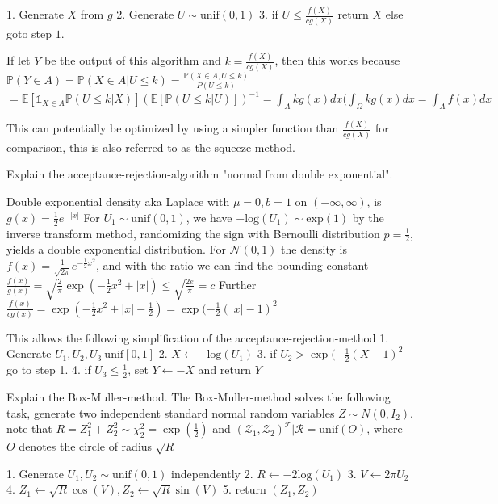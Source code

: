 1. Generate \( X \) from \( g \)
2. Generate \( U \sim \text{unif}(0, 1) \)
3. if \( U \leq \frac{f(X)}{cg(X)} \) return \( X \) else goto step \( 1 \).

If let \( Y \) be the output of this algorithm and \( k = \frac{f(X)}{cg(X)} \), then this works because
\( \mathbb{P}(Y \in A) = \mathbb{P}(X \in A|U \leq k) = \frac{\mathbb{P}(X \in A, U \leq k)}{P(U \leq k)} \)
\( = \mathbb{E}[\mathbb{1}_{X \in A}\mathbb{P}(U \leq k|X)](\mathbb{E}[\mathbb{P}(U \leq k|U)])^{-1} = \int_A k g(x) dx (\int_\Omega k g(x) dx = \int_A f(x) dx \)

This can potentially be optimized by using a simpler function than \(\frac{f(X)}{cg(X)} \) for comparison, this is also referred to as the squeeze method.


Explain the acceptance-rejection-algorithm "normal from double exponential".

Double exponential density aka Laplace with \( \mu = 0, b = 1 \) on \( (-\infty, \infty) \), is \( g(x) = \frac{1}{2} e^{-|x|} \)
For \( U_1 \sim \text{unif}(0, 1) \), we have \( -\text{log}(U_1) \sim \text{exp}(1) \) by the inverse transform method,
randomizing the sign with Bernoulli distribution \( p = \frac{1}{2} \), yields a double exponential distribution.
For \( \mathcal{N}(0, 1) \) the density is \( f(x) = \frac{1}{\sqrt{2\pi}}e^{-\frac{1}{2}x^2} \), and with the ratio 
we can find the bounding constant
\( \frac{f(x)}{g(x)} = \sqrt{\frac{2}{\pi}}\exp(-\frac{1}{2}x^2 + |x|) \leq \sqrt{\frac{2e}{\pi}} = c \)
Further \( \frac{f(x)}{cg(x)} = \exp(-\frac{1}{2}x^2 + |x| - \frac{1}{2}) = \exp(-\frac{1}{2}(|x| - 1)^{2} \)

This allows the following simplification of the acceptance-rejection-method
1. Generate \( U_1, U_2, U_3 ~ \text{unif}[0, 1] \)
2. \( X \leftarrow - \text{log}(U_1) \)
3. if \( U_2 > \exp(-\frac{1}{2}(X - 1)^2 \) go to step 1.
4. if \( U_3 \leq \frac{1}{2} \), set \( Y \leftarrow -X \) and return \( Y \)



Explain the Box-Muller-method.
The Box-Muller-method solves the following task, 
generate two independent standard normal random variables \( Z \sim N(0, I_2)\).
note that \( R = Z^2_1 + Z^2_2 \sim \chi_2^{2} = \exp(\frac{1}{2}) \)
and \( \mathcal{(Z_1, Z_2)^{T}|R} = \text{unif}(O) \), where \( O \) denotes the circle of radius \( \sqrt{R} \)

1. Generate \( U_1, U_2 \sim \text{unif}(0, 1) \) independently
2. \( R \leftarrow -2\text{log}(U_1) \)
3. \( V \leftarrow 2\pi U_2 \)
4. \( Z_1 \leftarrow \sqrt{R}\cos(V), Z_2 \leftarrow \sqrt{R}\sin(V)\)
5. return \((Z_1, Z_2)\)

